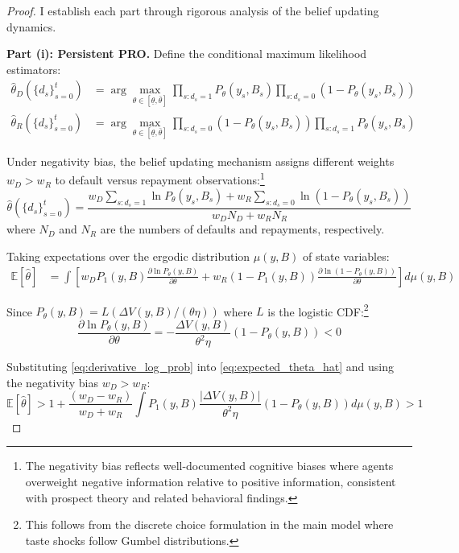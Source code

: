 \documentclass[12pt]{article}
\theoremstyle{plain}
\begin{document}
\begin{proof}
	I establish each part through rigorous analysis of the belief updating dynamics.

	\textbf{Part (i): Persistent PRO.}
	Define the conditional maximum likelihood estimators:
	\begin{align}
		\hat{\theta}_D(\{d_s\}_{s=0}^t) & = \arg\max_{\theta \in [\underline{\theta}, \bar{\theta}]} \prod_{s: d_s=1} P_\theta(y_s, B_s) \prod_{s: d_s=0} (1-P_\theta(y_s, B_s)) \label{eq:mle_default} \\
		\hat{\theta}_R(\{d_s\}_{s=0}^t) & = \arg\max_{\theta \in [\underline{\theta}, \bar{\theta}]} \prod_{s: d_s=0} (1-P_\theta(y_s, B_s)) \prod_{s: d_s=1} P_\theta(y_s, B_s) \label{eq:mle_repay}
	\end{align}

	Under negativity bias, the belief updating mechanism assigns different weights
	$w_D > w_R$ to default versus repayment observations:\footnote{The negativity
		bias reflects well-documented cognitive biases where agents overweight negative
		information relative to positive information, consistent with prospect theory
		and related behavioral findings.}
	\begin{equation}
		\hat{\theta}(\{d_s\}_{s=0}^t) = \frac{w_D \sum_{s: d_s=1} \ln P_\theta(y_s, B_s) + w_R \sum_{s: d_s=0} \ln(1-P_\theta(y_s, B_s))}{w_D N_D + w_R N_R} \label{eq:weighted_mle}
	\end{equation}
	where $N_D$ and $N_R$ are the numbers of defaults and repayments, respectively.

	Taking expectations over the ergodic distribution $\mu(y,B)$ of state
	variables:
	\begin{align}
		\mathbb{E}[\hat{\theta}] & = \int \left[ w_D P_1(y,B) \frac{\partial \ln P_\theta(y,B)}{\partial \theta} + w_R (1-P_1(y,B)) \frac{\partial \ln(1-P_\theta(y,B))}{\partial \theta} \right] d\mu(y,B) \label{eq:expected_theta_hat}
	\end{align}

	Since $P_\theta(y,B) = L(\Delta V(y,B)/(\theta\eta))$ where $L$ is the logistic
	CDF:\footnote{This follows from the discrete choice formulation in the main
		model where taste shocks follow Gumbel distributions.}
	\begin{equation}
		\frac{\partial \ln P_\theta(y,B)}{\partial \theta} = -\frac{\Delta V(y,B)}{\theta^2\eta} (1-P_\theta(y,B)) < 0 \label{eq:derivative_log_prob}
	\end{equation}

	Substituting \eqref{eq:derivative_log_prob} into \eqref{eq:expected_theta_hat}
	and using the negativity bias $w_D > w_R$:
	\begin{equation}
		\mathbb{E}[\hat{\theta}] > 1 + \frac{(w_D - w_R)}{w_D + w_R} \int P_1(y,B) \frac{|\Delta V(y,B)|}{\theta^2\eta} (1-P_\theta(y,B)) d\mu(y,B) > 1 \label{eq:persistent_pessimism}
	\end{equation}


\end{proof}
\end{document}
